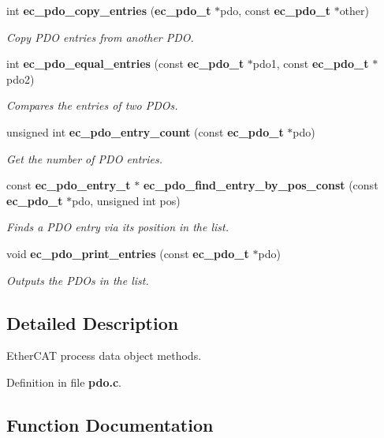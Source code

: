 \begin{DoxyCompactItemize}
int {\bf ec\-\_\-pdo\-\_\-copy\-\_\-entries} ({\bf ec\-\_\-pdo\-\_\-t} $\ast$pdo, const {\bf ec\-\_\-pdo\-\_\-t} $\ast$other)
\begin{DoxyCompactList}\small\item\em Copy P\-D\-O entries from another P\-D\-O. \end{DoxyCompactList}\item 
int {\bf ec\-\_\-pdo\-\_\-equal\-\_\-entries} (const {\bf ec\-\_\-pdo\-\_\-t} $\ast$pdo1, const {\bf ec\-\_\-pdo\-\_\-t} $\ast$pdo2)
\begin{DoxyCompactList}\small\item\em Compares the entries of two P\-D\-Os. \end{DoxyCompactList}\item 
unsigned int {\bf ec\-\_\-pdo\-\_\-entry\-\_\-count} (const {\bf ec\-\_\-pdo\-\_\-t} $\ast$pdo)
\begin{DoxyCompactList}\small\item\em Get the number of P\-D\-O entries. \end{DoxyCompactList}\item 
const {\bf ec\-\_\-pdo\-\_\-entry\-\_\-t} $\ast$ {\bf ec\-\_\-pdo\-\_\-find\-\_\-entry\-\_\-by\-\_\-pos\-\_\-const} (const {\bf ec\-\_\-pdo\-\_\-t} $\ast$pdo, unsigned int pos)
\begin{DoxyCompactList}\small\item\em Finds a P\-D\-O entry via its position in the list. \end{DoxyCompactList}\item 
void {\bf ec\-\_\-pdo\-\_\-print\-\_\-entries} (const {\bf ec\-\_\-pdo\-\_\-t} $\ast$pdo)
\begin{DoxyCompactList}\small\item\em Outputs the P\-D\-Os in the list. \end{DoxyCompactList}\end{DoxyCompactItemize}


\subsection{Detailed Description}
Ether\-C\-A\-T process data object methods. 

Definition in file {\bf pdo.\-c}.



\subsection{Function Documentation}
